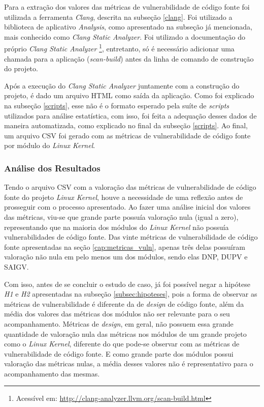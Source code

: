 Para a extração dos valores das métricas de vulnerabilidade de código fonte foi
utilizada a ferramenta \emph{Clang}, descrita na subseção
\ref{clang}. Foi utilizado a biblioteca de aplicativo
\textit{Analysis}, como apresentado na subseção já mencionada, mais conhecido como \emph{Clang Static
Analyzer}. Foi utilizado a documentação do próprio \emph{Clang Static Analyzer}
\footnote{Acessível em: \url{http://clang-analyzer.llvm.org/scan-build.html}},
entretanto, só é necessário adicionar uma chamada para a aplicação
(\textit{scan-build}) antes da linha de comando de construção do projeto.

Após a execução do \emph{Clang Static Analyzer} juntamente com a construção do
projeto, é dado um arquivo HTML como saída da aplicação. Como foi explicado na
subseção \ref{scripts}, esse não é o formato esperado pela suíte de
\textit{scripts} utilizados para análise estatística, com isso, foi feita a
adequação desses dados de maneira automatizada, como explicado no final da
subseção \ref{scripts}. Ao final, um arquivo CSV foi gerado com as métricas de
vulnerabilidade de código fonte por módulo do \emph{Linux Kernel}.

\subsubsection{Análise dos Resultados}

Tendo o arquivo CSV com a valoração das métricas de vulnerabilidade de código
fonte do projeto \emph{Linux Kernel}, houve a necessidade de uma reflexão antes
de prosseguir com o processo apresentado. Ao
fazer uma análise inicial dos valores das métricas, viu-se que grande parte
possuía valoração nula (igual a zero), representando que na maioria dos módulos
do \emph{Linux Kernel} não possuía vulnerabilidades de código fonte. Das vinte
métricas de vulnerabilidade de código fonte apresentadas na seção
\ref{cap:metricas_vuln}, apenas três delas possuíram valoração não nula em pelo
menos um dos módulos, sendo elas DNP, DUPV e SAIGV. 

Com isso, antes de se concluir o estudo de caso, já foi
possível negar a hipótese \emph{H1} e \emph{H2} apresentadas na subseção
\ref{subsec:hipoteses}, pois a forma de observar as métricas de vulnerabilidade
é diferente da de \textit{design} de código fonte, além da média dos valores
das métricas dos módulos não ser relevante para o seu acompanhamento. Métricas de \textit{design},
em geral, não possuem essa grande quantidade de valoração nula das métricas nos
módulos de um grande projeto como o \emph{Linux Kernel}, diferente do que
pode-se observar com as métricas de vulnerabilidade de código fonte. E como
grande parte dos módulos possui valoração das métricas nulas, a média desses
valores não é representativo para o acompanhamento das mesmas.

